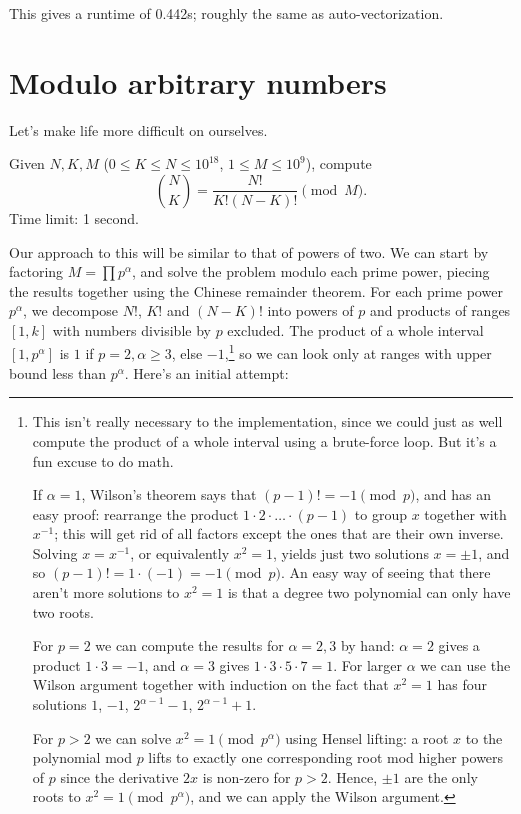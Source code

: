 This gives a runtime of 0.442s; roughly the same as auto-vectorization.

\section{Modulo arbitrary numbers}

Let's make life more difficult on ourselves.

\begin{framed}
\noindent
Given $N, K, M$ ($0 \le K \le N \le 10^{18}$, $1 \le M \le 10^9$), compute
\[
\binom N K = \frac{N!}{K!(N-K)!} \pmod {M}.
\]
Time limit: 1 second.
\end{framed}

Our approach to this will be similar to that of powers of two.
We can start by factoring $M = \prod p^\alpha$, and solve the problem modulo each prime power, piecing the results together using the Chinese remainder theorem.
For each prime power $p^\alpha$, we decompose $N!$, $K!$ and $(N-K)!$ into powers of $p$ and products of ranges $[1, k]$ with numbers divisible by $p$ excluded.
The product of a whole interval $[1, p^\alpha]$ is $1$ if $p = 2, \alpha \ge 3$, else $-1$,\footnote{
This isn't really necessary to the implementation, since we could just as well compute the product of a whole interval using a brute-force loop. But it's a fun excuse to do math.

If $\alpha = 1$, Wilson's theorem says that $(p-1)! = -1 \pmod{p}$, and has an easy proof: rearrange the product $1 \cdot 2 \cdot \ldots \cdot (p-1)$ to group $x$ together with $x^{-1}$; this will get rid of all factors except the ones that are their own inverse. Solving $x = x^{-1}$, or equivalently $x^2 = 1$, yields just two solutions $x = \pm 1$, and so $(p-1)! = 1 \cdot (-1) = -1\pmod{p}$. An easy way of seeing that there aren't more solutions to $x^2 = 1$ is that a degree two polynomial can only have two roots.

For $p = 2$ we can compute the results for $\alpha = 2, 3$ by hand: $\alpha = 2$ gives a product $1 \cdot 3 = -1$, and $\alpha = 3$ gives $1 \cdot 3 \cdot 5 \cdot 7 = 1$. For larger $\alpha$ we can use the Wilson argument together with induction on the fact that $x^2 = 1$ has four solutions $1$, $-1$, $2^{\alpha-1} - 1$, $2^{\alpha-1} + 1$.

For $p > 2$ we can solve $x^2 = 1 \pmod{p^\alpha}$ using Hensel lifting: a root $x$ to the polynomial mod $p$ lifts to exactly one corresponding root mod higher powers of $p$ since the derivative $2x$ is non-zero for $p > 2$. Hence, $\pm 1$ are the only roots to $x^2 = 1 \pmod{p^\alpha}$, and we can apply the Wilson argument.
}
so we can look only at ranges with upper bound less than $p^\alpha$.
Here's an initial attempt:

